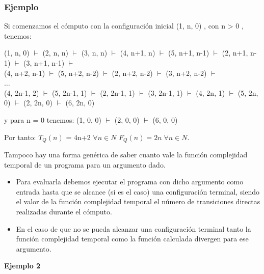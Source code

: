 \documentclass[xcolor=table]{beamer}
\begin{document}
\begin{frame}[fragile]\frametitle{Ejemplo} \footnotesize  

Si comenzamos el cómputo con la configuración inicial (1, n, 0) , con n > 0 , tenemos:

\hspace{0.2cm} (1, n, 0) $\vdash$ (2, n, n) $\vdash$ (3, n, n) $\vdash$ (4, n+1, n) $\vdash$ (5, n+1, n-1) $\vdash$ (2, n+1, n-1) $\vdash$ (3, n+1, n-1) $\vdash$\\
\hspace{0.2cm} (4, n+2, n-1) $\vdash$ (5, n+2, n-2) $\vdash$ (2, n+2, n-2) $\vdash$ (3, n+2, n-2) $\vdash$\\
\hspace{0.2cm}$\ldots$\\
\hspace{0.2cm} (4, 2n-1, 2) $\vdash$ (5, 2n-1, 1) $\vdash$ (2, 2n-1, 1) $\vdash$ (3, 2n-1, 1) $\vdash$ (4, 2n, 1) $\vdash$ (5, 2n, 0) $\vdash$ (2, 2n, 0) $\vdash$ (6, 2n, 0)\\
\vspace{0.2cm}

y para n = 0 tenemos: (1, 0, 0) $\vdash$ (2, 0, 0) $\vdash$ (6, 0, 0)
\vspace{0.2cm}

Por tanto: $T_Q(n)$ = 4n+2  $\forall n \in N $ $F_Q(n) = 2n\; \forall n \in N$.
\vspace{0.2cm}

Tampoco hay una forma genérica de saber cuanto vale la función complejidad temporal de un programa para un
argumento dado.
\begin{itemize}
    \item Para evaluarla debemos ejecutar el programa con dicho argumento como entrada hasta que se alcance (si es el caso) una configuración terminal, siendo el valor de la función complejidad temporal el número de transiciones directas realizadas durante el cómputo.

    \item En el caso de que no se pueda alcanzar una configuración terminal tanto la función complejidad temporal como la función calculada divergen para ese argumento.

\end{itemize}


\end{frame}

\begin{frame}  \Large

\begin{center}
    \textbf{Ejemplo 2 }
\end{center}

\end{frame} 
\end{document}
